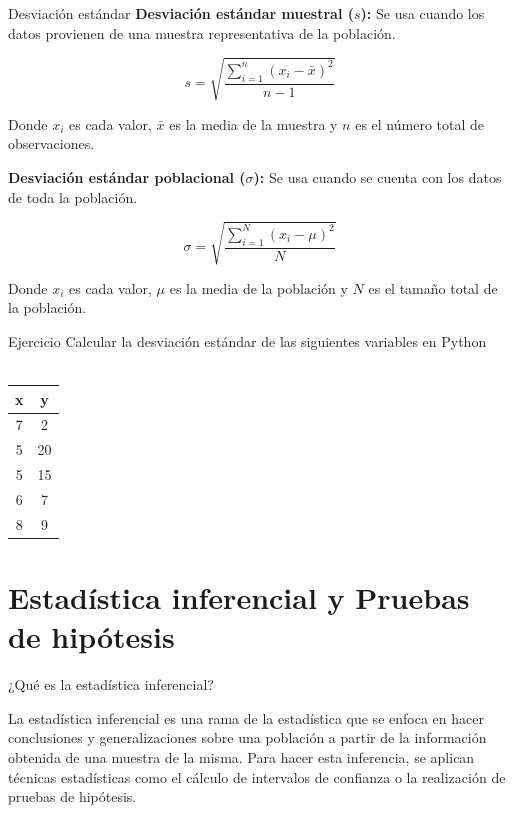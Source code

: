 \documentclass[11pt, aspectratio=169]{beamer}
\begin{document}
\begin{frame}
{Desviación estándar}{}
 \centering
 \textbf{Desviación estándar muestral ($ s $):} Se usa cuando los datos
 provienen de una muestra representativa de la población.\\
 \vspace{-1em}

 \[ s = \sqrt{\dfrac{\sum_{i=1}^{n} (x_i - \bar{x})^2}{n - 1}} \]

 Donde $ x_{i} $ es cada valor, $ \bar{x} $ es la media de la muestra y $ n
 $ es el número total de observaciones.

 \pause

 \textbf{Desviación estándar poblacional ($ \sigma $):} Se usa cuando se
 cuenta con los datos de toda la población.\\
 \vspace{-1em}

 \[ \sigma = \sqrt{\dfrac{\sum_{i=1}^{N}(x_i - \mu)^2}{N}} \]

 Donde $ x_{i} $ es cada valor, $ \mu $ es la media de la población y $ N $
 es el tamaño total de la población.
\end{frame}

\begin{frame}
{Ejercicio}{}
 \centering \Large
 Calcular la desviación estándar de las siguientes variables en Python\\~\\
 \begin{tabular}{|c|c|}
 \hline
 x & y \\
 \hline
 7 & 2 \\
 \hline
 5 & 20 \\
 \hline
 5 & 15 \\
 \hline
 6 & 7 \\
 \hline
 8 & 9 \\
 \hline
 \end{tabular}
\end{frame}

\section{Estadística inferencial y Pruebas de hipótesis}

\begin{frame}
{¿Qué es la estadística inferencial?}{}
 \centering \Large

 La estadística inferencial es una rama de la estadística que se enfoca en
 hacer conclusiones y generalizaciones sobre una población a partir de la
 información obtenida de una muestra de la misma. Para hacer esta
 inferencia, se aplican técnicas estadísticas como el cálculo de intervalos
 de confianza o la realización de pruebas de hipótesis.
\end{frame}
\end{document}
